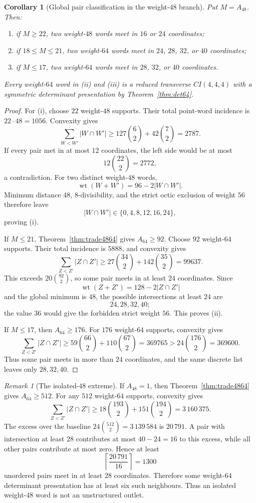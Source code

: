 \documentclass[11pt,reqno]{amsart}
\newtheorem{corollary}[theorem]{Corollary}
\theoremstyle{remark}
\newtheorem{remark}[theorem]{Remark}
\newcommand{\wt}{\operatorname{wt}}
\begin{document}
\begin{corollary}[Global pair classification in the weight-$48$ branch]\label{cor:w48pairs}
Put $M=A_{48}$.  Then:
\begin{enumerate}[label=(\roman*)]
\item if $M\ge22$, two weight-$48$ words meet in $16$ or $24$ coordinates;
\item if $18\le M\le21$, two weight-$64$ words meet in $24$, $28$, $32$, or $40$ coordinates;
\item if $M\le17$, two weight-$64$ words meet in $28$, $32$, or $40$ coordinates.
\end{enumerate}
Every weight-$64$ word in (ii) and (iii) is a reduced transverse $CI(4,4,4)$ with a symmetric determinant presentation by Theorem~\ref{thm:det64}.
\end{corollary}

\begin{proof}
For (i), choose $22$ weight-$48$ supports.  Their total point-word incidence is $22\cdot48=1056$.  Convexity gives
\[
\sum_{W<W'}|W\cap W'|
\ge127\binom62+42\binom72
=2787.
\]
If every pair met in at most $12$ coordinates, the left side would be at most
\[
12\binom{22}{2}=2772,
\]
a contradiction.  For two distinct weight-$48$ words,
\[
\wt(W+W')=96-2|W\cap W'|.
\]
Minimum distance $48$, $8$-divisibility, and the strict octic exclusion of weight $56$ therefore leave
\[
|W\cap W'|\in\{0,4,8,12,16,24\},
\]
proving (i).

If $M\le21$, Theorem~\ref{thm:trade4864} gives $A_{64}\ge92$.  Choose $92$ weight-$64$ supports.  Their total incidence is $5888$, and convexity gives
\[
\sum_{Z<Z'}|Z\cap Z'|
\ge27\binom{34}{2}+142\binom{35}{2}
=99637.
\]
This exceeds $20\binom{92}{2}$, so some pair meets in at least $24$ coordinates.  Since
\[
\wt(Z+Z')=128-2|Z\cap Z'|
\]
and the global minimum is $48$, the possible intersections at least $24$ are
\[
24,28,32,40;
\]
the value $36$ would give the forbidden strict weight $56$.  This proves (ii).

If $M\le17$, then $A_{64}\ge176$.  For $176$ weight-$64$ supports, convexity gives
\[
\sum_{Z<Z'}|Z\cap Z'|
\ge59\binom{66}{2}+110\binom{67}{2}
=369765
>24\binom{176}{2}=369600.
\]
Thus some pair meets in more than $24$ coordinates, and the same discrete list leaves only $28,32,40$.
\end{proof}

\begin{remark}[The isolated-$48$ extreme]\label{rem:isolated48}
If $A_{48}=1$, then Theorem~\ref{thm:trade4864} gives $A_{64}\ge512$.  For any $512$ weight-$64$ supports, convexity gives
\[
\sum_{Z<Z'}|Z\cap Z'|
\ge18\binom{193}{2}+151\binom{194}{2}
=3\,160\,375.
\]
The excess over the baseline $24\binom{512}{2}=3\,139\,584$ is $20\,791$.  A pair with intersection at least $28$ contributes at most $40-24=16$ to this excess, while all other pairs contribute at most zero.  Hence at least
\[
\left\lceil\frac{20\,791}{16}\right\rceil=1300
\]
unordered pairs meet in at least $28$ coordinates.  Therefore some weight-$64$ determinant presentation has at least six such neighbours.  Thus an isolated weight-$48$ word is not an unstructured outlet.
\end{remark}
\end{document}
